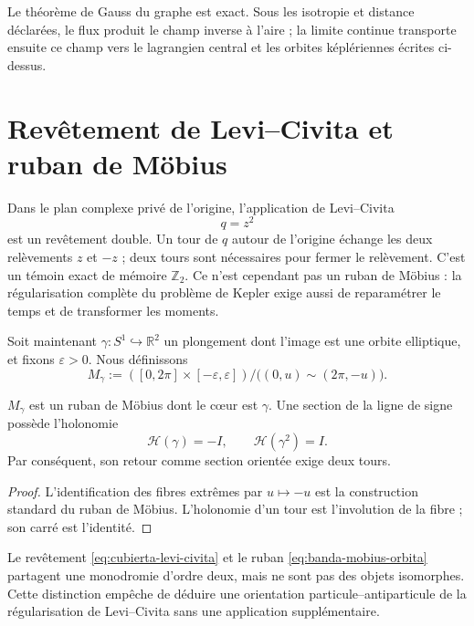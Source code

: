 Le théorème de Gauss du graphe est exact. Sous les isotropie et distance
déclarées, le flux produit le champ inverse à l'aire ; la limite continue
transporte ensuite ce champ vers le lagrangien central et les orbites
képlériennes écrites ci-dessus.

\section{Revêtement de Levi--Civita et ruban de Möbius}
\label{sec:levi-civita-mobius-kepler}

Dans le plan complexe privé de l'origine, l'application de Levi--Civita
\[
 q=z^2
 \tag{K8}\label{eq:cubierta-levi-civita}
\]
est un revêtement double. Un tour de \(q\) autour de l'origine échange
les deux relèvements \(z\) et \(-z\) ; deux tours sont nécessaires pour fermer le
relèvement. C'est
un témoin exact de mémoire \(\mathbb Z_2\). Ce n'est cependant pas un ruban
de Möbius : la régularisation complète du problème de Kepler exige aussi
de reparamétrer le temps et de transformer les moments.

Soit maintenant \(\gamma:S^1\hookrightarrow\mathbb R^2\) un plongement dont l'image
est une orbite elliptique, et fixons \(\varepsilon>0\). Nous définissons
\[
 M_\gamma
 :=([0,2\pi]\times[-\varepsilon,\varepsilon])/
 \bigl((0,u)\sim(2\pi,-u)\bigr).
 \tag{K9}\label{eq:banda-mobius-orbita}
\]

\begin{theorem}
\label{thm:periodo-orientado-banda-orbital}
\(M_\gamma\) est un ruban de Möbius dont le cœur est \(\gamma\). Une section
de la ligne de signe possède l'holonomie
\[
 \mathcal H(\gamma)=-I,
 \qquad
 \mathcal H(\gamma^2)=I.
 \tag{K10}\label{eq:holonomia-banda-orbital}
\]
Par conséquent, son retour comme section orientée exige deux tours.
\end{theorem}

\begin{proof}
L'identification des fibres extrêmes par \(u\mapsto-u\) est la
construction standard du ruban de Möbius. L'holonomie d'un tour est
l'involution de la fibre ; son carré est l'identité.
\end{proof}

Le revêtement \eqref{eq:cubierta-levi-civita} et le ruban
\eqref{eq:banda-mobius-orbita} partagent une monodromie d'ordre deux, mais ne
sont pas des objets isomorphes. Cette distinction empêche de déduire une orientation
particule--antiparticule de la régularisation de Levi--Civita sans une
application supplémentaire.

